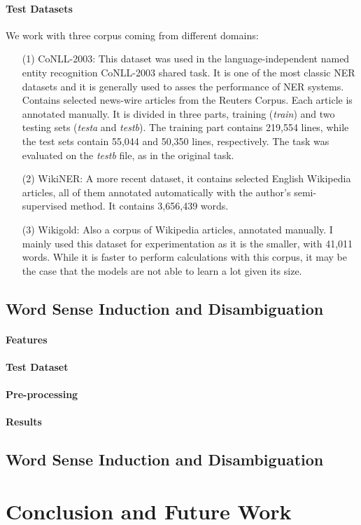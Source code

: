 \documentclass[11pt]{article}
\begin{document}
\paragraph{Test Datasets}We work with three corpus coming from different domains:
\begin{itemize}
\item [(1)] CoNLL-2003: This dataset was used in the language-independent named entity recognition CoNLL-2003 shared task. It is one of the most classic NER datasets and it is generally used to asses the performance of NER systems. Contains selected news-wire articles from the Reuters Corpus. Each article is annotated manually. It is divided in three parts,  training (\textit{train}) and two testing sets (\textit{testa} and \textit{testb}). The training part contains 219,554 lines, while the test sets contain 55,044 and 50,350 lines, respectively. The task was evaluated on the \textit{testb} file, as in the original task.
\item [(2)]WikiNER: A more recent dataset, it contains selected English Wikipedia articles, all of them annotated automatically with the author's semi-supervised method. It contains 3,656,439 words. 
\item[(3)] Wikigold: Also a corpus of Wikipedia articles, annotated manually. I mainly used this dataset for experimentation as it is the smaller, with 41,011 words. While it is faster to perform calculations with this corpus, it may be the case that the models are not able to learn a lot given its size.

\end{itemize}


\subsection{Word Sense Induction and Disambiguation}
\paragraph{Features}
\paragraph{Test Dataset}
\paragraph{Pre-processing}
\paragraph{Results}



\subsection{Word Sense Induction and Disambiguation}

\section{Conclusion and Future Work}




\end{document}
